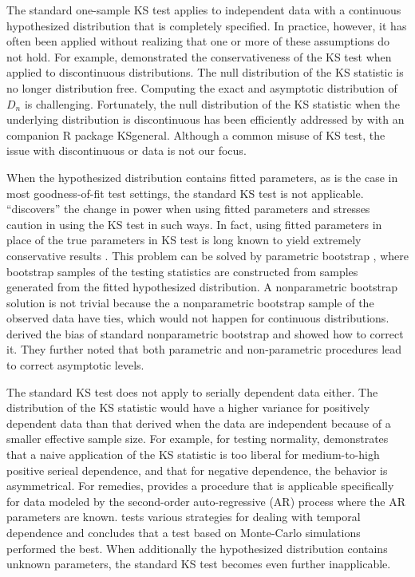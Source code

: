 \documentclass[12pt, letterpaper, titlepage]{article}
\begin{document}
The standard one-sample KS test applies to independent data with a continuous
hypothesized distribution that is completely specified. In practice, however, it
has often been applied without realizing that one or more of these assumptions
do not hold. For example, \citet{Noether} demonstrated the conservativeness of
the KS test when applied to discontinuous distributions. The null distribution
of the KS statistic is no longer distribution free. Computing the
exact and asymptotic distribution of $D_n$ is challenging. Fortunately, the null
distribution of the KS statistic when the underlying distribution is
discontinuous has been efficiently addressed by \citet{Dimitrova} with an
companion R package \textsf{KSgeneral}. Although a common misuse of KS test, the
issue with discontinuous or data is not our focus.


When the hypothesized distribution contains fitted parameters, as is the case in
most goodness-of-fit test settings, the standard KS test is not applicable.
\citet{Steinskog} ``discovers'' the change in power
when using fitted parameters and stresses caution in using the KS test in
such ways. In fact, using fitted parameters in place of the true parameters in
KS test is long known to yield extremely conservative results
\citep[e.g.,][]{Lilliefors}. This problem can be solved by parametric
bootstrap \citep{efron1985bootstrap, hall1991two}, where
bootstrap samples of the testing statistics are constructed from samples
generated from the fitted hypothesized distribution. A nonparametric bootstrap
solution is not trivial because the a nonparametric bootstrap sample of the
observed data have ties, which would not happen for continuous distributions.
\citet{Babu} derived the bias of standard nonparametric bootstrap and
showed how to correct it. They further noted that both parametric and
non-parametric procedures lead to correct asymptotic levels.


The standard KS test does not apply to serially dependent data either. The
distribution of the KS statistic would have a higher variance for positively
dependent data than that derived when the data are independent because of a
smaller effective sample size. For example, for
testing normality, \citet{Durilleul} demonstrates that a naive application of
the KS statistic is too liberal for medium-to-high positive serieal dependence,
and that for negative dependence, the behavior is asymmetrical. For remedies,
\citet{Weiss} provides a procedure that is applicable specifically for data
modeled by the second-order auto-regressive (AR) process where the AR parameters
are known. \citet{Lanzante} tests various strategies for dealing with temporal
dependence and concludes that a test based on Monte-Carlo simulations performed
the best. When additionally the hypothesized distribution contains unknown
parameters, the standard KS test becomes even further inapplicable.
\end{document}
